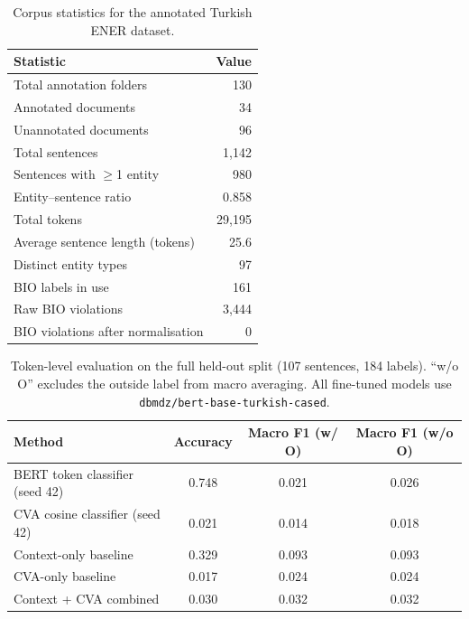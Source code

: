 
\begin{table}[ht]
\centering
\caption{Corpus statistics for the annotated Turkish ENER dataset.}
\label{tab:corpus_stats}
\begin{tabular}{lr}
\toprule
Statistic & Value \\
\midrule
Total annotation folders & 130 \\
Annotated documents & 34 \\
Unannotated documents & 96 \\
Total sentences & 1{,}142 \\
Sentences with $\geq$1 entity & 980 \\
Entity--sentence ratio & 0.858 \\
Total tokens & 29{,}195 \\
Average sentence length (tokens) & 25.6 \\
Distinct entity types & 97 \\
BIO labels in use & 161 \\
Raw BIO violations & 3{,}444 \\
BIO violations after normalisation & 0 \\
\bottomrule
\end{tabular}
\end{table}

\begin{table}[ht]
\centering
\caption{Token-level evaluation on the full held-out split (107 sentences, 184 labels).
``w/o O'' excludes the outside label from macro averaging.
All fine-tuned models use \texttt{dbmdz/bert-base-turkish-cased}.}
\label{tab:main_results}
\begin{tabular}{lccc}
\toprule
Method & Accuracy & Macro F1 (w/ O) & Macro F1 (w/o O) \\
\midrule
BERT token classifier (seed 42) & 0.748 & 0.021 & 0.026 \\
CVA cosine classifier (seed 42) & 0.021 & 0.014 & 0.018 \\
Context-only baseline & 0.329 & 0.093 & 0.093 \\
CVA-only baseline & 0.017 & 0.024 & 0.024 \\
Context + CVA combined & 0.030 & 0.032 & 0.032 \\
\bottomrule
\end{tabular}
\end{table}

